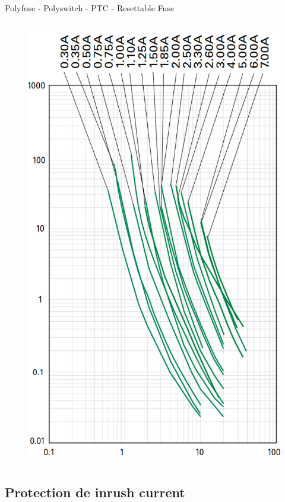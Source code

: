 \begin{frame}{Polyfuse - Polyswitch - PTC - Resettable Fuse}
\begin{columns}
        \begin{column}{0.6\textwidth}
            \begin{figure}
                \centering
                \includegraphics[width=\textwidth, height=0.825\textheight, keepaspectratio]{pictures/polyfuse-curve.png}
            \end{figure}
        \end{column}
    \end{columns}
\end{frame}

\subsection{Protection de inrush current}

